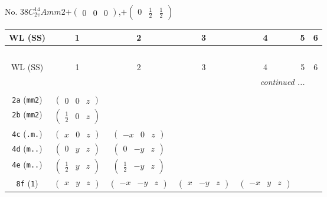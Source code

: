 \documentclass[fleqn,9pt,landscape]{jsarticle}
\begin{document}
\newpage
No. 38\quad$C_{2v}^{14}$\quad$Amm2$\quad[ orthorhombic ]\quad$+\begin{pmatrix} 0 & 0 & 0 \end{pmatrix}$,\quad $+\begin{pmatrix} 0 & \frac{1}{2} & \frac{1}{2} \end{pmatrix}$
\begin{center}
\renewcommand{\arraystretch}{1.2}
\begin{longtable}{ccccccc}
 \hline \hline
WL (SS) & 1 & 2 & 3 & 4 & 5 & 6 \\ \hline \endfirsthead

\multicolumn{6}{l}{\tablename\ \thetable{}} \\
 \hline \hline
WL (SS) & 1 & 2 & 3 & 4 & 5 & 6 \\ \hline \endhead

 \hline \hline
\multicolumn{6}{r}{\footnotesize\it continued ...} \\ \endfoot

 \hline \hline
\multicolumn{6}{r}{} \\ \endlastfoot

{\tt 2a} ({\tt mm2}) & $ \begin{pmatrix} 0 & 0 & z \end{pmatrix} $ & $  $ & $  $ & $  $ \\ \hline
{\tt 2b} ({\tt mm2}) & $ \begin{pmatrix} \frac{1}{2} & 0 & z \end{pmatrix} $ & $  $ & $  $ & $  $ \\ \hline
{\tt 4c} ({\tt .m.}) & $ \begin{pmatrix} x & 0 & z \end{pmatrix} $ & $ \begin{pmatrix} - x & 0 & z \end{pmatrix} $ & $  $ & $  $ \\ \hline
{\tt 4d} ({\tt m..}) & $ \begin{pmatrix} 0 & y & z \end{pmatrix} $ & $ \begin{pmatrix} 0 & - y & z \end{pmatrix} $ & $  $ & $  $ \\ \hline
{\tt 4e} ({\tt m..}) & $ \begin{pmatrix} \frac{1}{2} & y & z \end{pmatrix} $ & $ \begin{pmatrix} \frac{1}{2} & - y & z \end{pmatrix} $ & $  $ & $  $ \\ \hline
{\tt 8f} ({\tt 1}) & $ \begin{pmatrix} x & y & z \end{pmatrix} $ & $ \begin{pmatrix} - x & - y & z \end{pmatrix} $ & $ \begin{pmatrix} x & - y & z \end{pmatrix} $ & $ \begin{pmatrix} - x & y & z \end{pmatrix} $ \\
\end{longtable}
\end{center}
\end{document}
